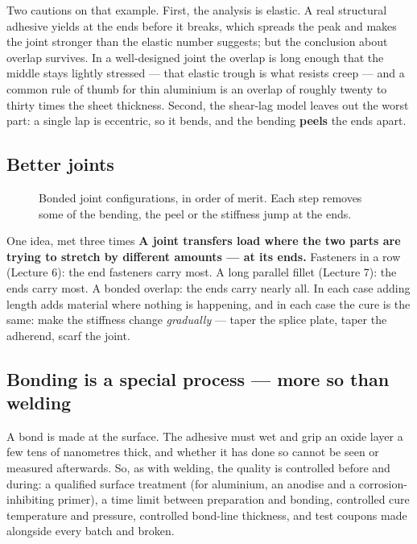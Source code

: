 \documentclass[11pt,a4paper]{article}
\begin{document}
\noindent Two cautions on that example. First, the analysis is elastic. A real structural adhesive
yields at the ends before it breaks, which spreads the peak and makes the joint stronger than the
elastic number suggests; but the conclusion about overlap survives. In a well-designed joint the
overlap is long enough that the middle stays lightly stressed --- that elastic trough is what
resists creep --- and a common rule of thumb for thin aluminium is an overlap of roughly twenty to
thirty times the sheet thickness. Second, the shear-lag model leaves out the worst part: a single
lap is eccentric, so it bends, and the bending \textbf{peels} the ends apart.

\subsection{Better joints}

\begin{figure}[H]\centering
\resizebox{0.9\textwidth}{!}{}
\caption{Bonded joint configurations, in order of merit. Each step removes some of the bending, the
peel or the stiffness jump at the ends.}
\label{fig:joints}
\end{figure}

\begin{keybox}{One idea, met three times}
\textbf{A joint transfers load where the two parts are trying to stretch by different amounts ---
at its ends.} Fasteners in a row (Lecture 6): the end fasteners carry most. A long parallel fillet
(Lecture 7): the ends carry most. A bonded overlap: the ends carry nearly all. In each case adding
length adds material where nothing is happening, and in each case the cure is the same: make the
stiffness change \emph{gradually} --- taper the splice plate, taper the adherend, scarf the joint.
\end{keybox}

\subsection{Bonding is a special process --- more so than welding}
\label{sec:bondprocess}

A bond is made at the surface. The adhesive must wet and grip an oxide layer a few tens of
nanometres thick, and whether it has done so cannot be seen or measured afterwards. So, as with
welding, the quality is controlled before and during: a qualified surface treatment (for aluminium,
an anodise and a corrosion-inhibiting primer), a time limit between preparation and bonding,
controlled cure temperature and pressure, controlled bond-line thickness, and test coupons made
alongside every batch and broken.
\end{document}
